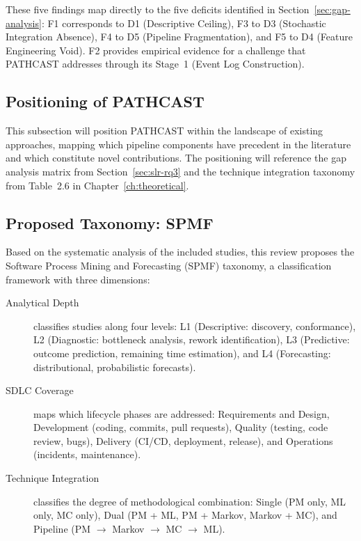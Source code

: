 These five findings map directly to the five deficits identified in Section~\ref{sec:gap-analysis}: F1 corresponds to D1 (Descriptive Ceiling), F3 to D3 (Stochastic Integration Absence), F4 to D5 (Pipeline Fragmentation), and F5 to D4 (Feature Engineering Void). F2 provides empirical evidence for a challenge that PATHCAST addresses through its Stage~1 (Event Log Construction).


\subsection{Positioning of PATHCAST}
\label{sec:slr-positioning}


This subsection will position PATHCAST within the landscape of existing approaches, mapping which pipeline components have precedent in the literature and which constitute novel contributions. The positioning will reference the gap analysis matrix from Section~\ref{sec:slr-rq3} and the technique integration taxonomy from Table~2.6 in Chapter~\ref{ch:theoretical}.


\subsection{Proposed Taxonomy: SPMF}
\label{sec:slr-taxonomy}

Based on the systematic analysis of the included studies, this review proposes the Software Process Mining and Forecasting (SPMF) taxonomy, a classification framework with three dimensions:

\begin{description}
\item[Analytical Depth] classifies studies along four levels: L1 (Descriptive: discovery, conformance), L2 (Diagnostic: bottleneck analysis, rework identification), L3 (Predictive: outcome prediction, remaining time estimation), and L4 (Forecasting: distributional, probabilistic forecasts).

\item[SDLC Coverage] maps which lifecycle phases are addressed: Requirements and Design, Development (coding, commits, pull requests), Quality (testing, code review, bugs), Delivery (CI/CD, deployment, release), and Operations (incidents, maintenance).

\item[Technique Integration] classifies the degree of methodological combination: Single (PM only, ML only, MC only), Dual (PM + ML, PM + Markov, Markov + MC), and Pipeline (PM $\rightarrow$ Markov $\rightarrow$ MC $\rightarrow$ ML).
\end{description}

